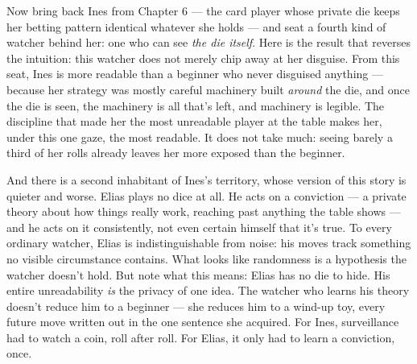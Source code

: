 Now bring back Ines from Chapter 6 --- the card player whose private die
keeps her betting pattern identical whatever she holds --- and seat a
fourth kind of watcher behind her: one who can see \emph{the die itself}.
Here is the result that reverses the intuition: this watcher does not merely chip
away at her disguise. From this seat, Ines is more readable than a
beginner who never disguised anything --- because her strategy was mostly
careful machinery built \emph{around} the die, and once the die is seen, the
machinery is all that's left, and machinery is legible. The discipline
that made her the most unreadable player at the table makes her, under
this one gaze, the most readable. It does not take much: seeing barely
a third of her rolls already leaves her more exposed than the beginner.

And there is a second inhabitant of Ines's territory, whose version of
this story is quieter and worse. Elias plays no dice at all. He acts on
a conviction --- a private theory about how things really work, reaching
past anything the table shows --- and he acts on it consistently, not
even certain himself that it's true. To every ordinary watcher, Elias
is indistinguishable from noise: his moves track something no visible
circumstance contains. What looks like randomness is a hypothesis the
watcher doesn't hold. But note what this means: Elias has no die to
hide. His entire unreadability \emph{is} the privacy of one idea. The
watcher who learns his theory doesn't reduce him to a beginner --- she
reduces him to a wind-up toy, every future move written out in the one
sentence she acquired. For Ines, surveillance had to watch a coin,
roll after roll. For Elias, it only had to learn a conviction, once.


